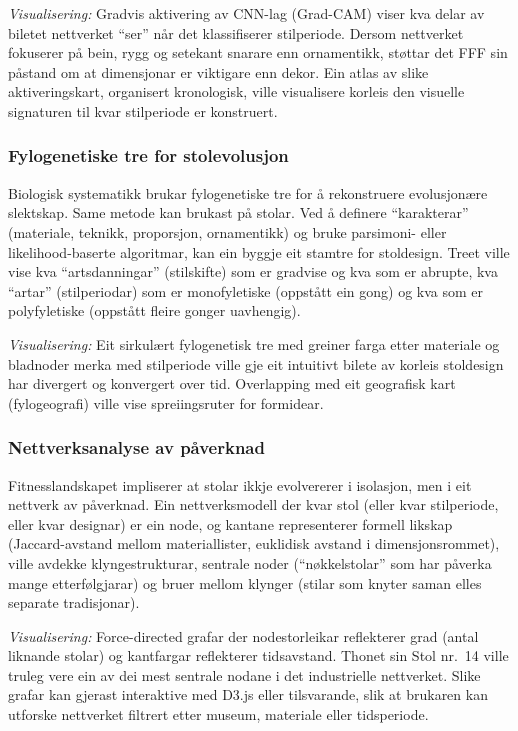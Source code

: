 \documentclass[10pt, a4paper, twocolumn]{article}
\begin{document}
\textit{Visualisering:} Gradvis aktivering av CNN-lag (Grad-CAM) viser kva delar av biletet nettverket ``ser'' når det klassifiserer stilperiode. Dersom nettverket fokuserer på bein, rygg og setekant snarare enn ornamentikk, støttar det FFF sin påstand om at dimensjonar er viktigare enn dekor. Ein atlas av slike aktiveringskart, organisert kronologisk, ville visualisere korleis den visuelle signaturen til kvar stilperiode er konstruert.

\subsubsection{Fylogenetiske tre for stolevolusjon}

Biologisk systematikk brukar fylogenetiske tre for å rekonstruere evolusjonære slektskap. Same metode kan brukast på stolar. Ved å definere ``karakterar'' (materiale, teknikk, proporsjon, ornamentikk) og bruke parsimoni- eller likelihood-baserte algoritmar, kan ein byggje eit stamtre for stoldesign. Treet ville vise kva ``artsdanningar'' (stilskifte) som er gradvise og kva som er abrupte, kva ``artar'' (stilperiodar) som er monofyletiske (oppstått ein gong) og kva som er polyfyletiske (oppstått fleire gonger uavhengig).

\textit{Visualisering:} Eit sirkulært fylogenetisk tre med greiner farga etter materiale og bladnoder merka med stilperiode ville gje eit intuitivt bilete av korleis stoldesign har divergert og konvergert over tid. Overlapping med eit geografisk kart (fylogeografi) ville vise spreiingsruter for formidear.

\subsubsection{Nettverksanalyse av påverknad}

Fitnesslandskapet impliserer at stolar ikkje evolvererer i isolasjon, men i eit nettverk av påverknad. Ein nettverksmodell der kvar stol (eller kvar stilperiode, eller kvar designar) er ein node, og kantane representerer formell likskap (Jaccard-avstand mellom materiallister, euklidisk avstand i dimensjonsrommet), ville avdekke klyngestrukturar, sentrale noder (``nøkkelstolar'' som har påverka mange etterfølgjarar) og bruer mellom klynger (stilar som knyter saman elles separate tradisjonar).

\textit{Visualisering:} Force-directed grafar der nodestorleikar reflekterer grad (antal liknande stolar) og kantfargar reflekterer tidsavstand. Thonet sin Stol nr.~14 ville truleg vere ein av dei mest sentrale nodane i det industrielle nettverket. Slike grafar kan gjerast interaktive med D3.js eller tilsvarande, slik at brukaren kan utforske nettverket filtrert etter museum, materiale eller tidsperiode.
\end{document}
